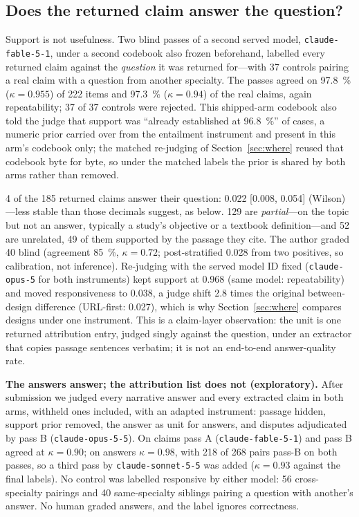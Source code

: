 \documentclass[conference,a4paper]{IEEEtran}
\begin{document}
\subsection{Does the returned claim answer the question?}
\label{sec:relevance}
Support is not usefulness. Two blind passes of a second served model,
\texttt{claude-fable-5-1}, under a second codebook also frozen beforehand, labelled every
returned claim against the \emph{question} it was returned for---with \num{37} controls
pairing a real claim with a question from another specialty. The passes agreed on
\SI{97.8}{\percent} ($\kappa = \num{0.955}$) of \num{222} items and \SI{97.3}{\percent}
($\kappa = \num{0.94}$) of the real claims, again repeatability; \num{37} of \num{37}
controls were rejected. This shipped-arm codebook also told the judge that support was
``already established at \SI{96.8}{\percent}'' of cases, a numeric prior carried over from
the entailment instrument and present in this arm's codebook only; the matched re-judging of
Section~\ref{sec:where} reused that codebook byte for byte, so under the matched labels the
prior is shared by both arms rather than removed.

\num{4} of the \num{185} returned claims answer their question: \num{0.022} [\num{0.008},
\num{0.054}] (Wilson)---less stable than those decimals suggest, as below. \num{129} are
\emph{partial}---on the topic but not an answer, typically a study's objective
or a textbook definition---and \num{52} are unrelated, \num{49} of them supported by the
passage they cite. The author graded \num{40} blind (agreement \SI{85}{\percent},
$\kappa = \num{0.72}$; post-stratified \num{0.028} from two positives, so calibration, not
inference). Re-judging with the served model ID fixed (\texttt{claude-opus-5} for both
instruments) kept support at \num{0.968} (same model: repeatability) and moved responsiveness
to \num{0.038}, a judge shift \num{2.8} times the original between-design difference
(URL-first: \num{0.027}), which is why Section~\ref{sec:where} compares designs under one
instrument. This is a claim-layer observation: the unit is one returned attribution entry,
judged singly against the question, under an extractor that copies passage sentences
verbatim; it is not an end-to-end answer-quality rate.

\textbf{The answers answer; the attribution list does not (exploratory).} After submission
we judged every narrative answer and every extracted claim in both arms, withheld ones
included, with an adapted instrument: passage hidden, support prior removed, the answer as
unit for answers, and disputes adjudicated by pass B (\texttt{claude-opus-5-5}). On claims
pass A (\texttt{claude-fable-5-1}) and pass B agreed at $\kappa = \num{0.90}$; on answers
$\kappa = \num{0.98}$, with 218 of 268 pairs pass-B on both passes, so a third pass by
\texttt{claude-sonnet-5-5} was added ($\kappa = \num{0.93}$ against the final labels). No control was labelled responsive by either model: \num{56} cross-specialty
pairings and \num{40} same-specialty siblings pairing a question with another's
answer. No human graded answers, and the label ignores correctness.
\end{document}
